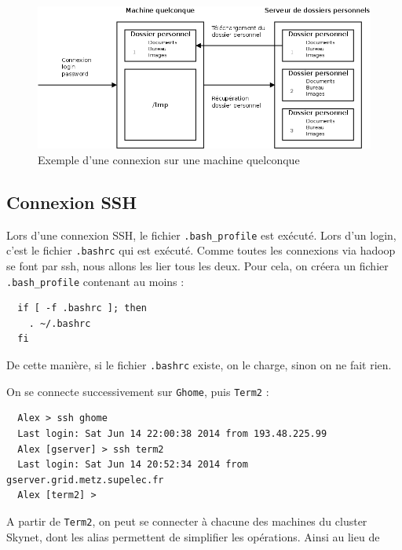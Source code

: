 \begin{figure}[h!]
  \centering
  \includegraphics[width=16cm]{images/connexion_supelec.png}
  \caption{Exemple d'une connexion sur une machine quelconque}
  \label{fig:connexion_supelec}
\end{figure}

\subsection{Connexion SSH}
\label{sec:connexion-ssh}

\par Lors d'une connexion SSH, le fichier \texttt{.bash\_profile} est exécuté. Lors d'un login, c'est le fichier \texttt{.bashrc} qui est exécuté. Comme toutes les connexions via hadoop se font par ssh, nous allons les lier tous les deux. Pour cela, on créera un fichier \texttt{.bash\_profile} contenant au moins :

\begin{verbatim}
  if [ -f .bashrc ]; then
    . ~/.bashrc
  fi
\end{verbatim}

\par De cette manière, si le fichier \texttt{.bashrc} existe, on le charge, sinon on ne fait rien.
\par On se connecte successivement sur \texttt{Ghome}, puis \texttt{Term2} :
\begin{verbatim}
  Alex > ssh ghome
  Last login: Sat Jun 14 22:00:38 2014 from 193.48.225.99
  Alex [gserver] > ssh term2
  Last login: Sat Jun 14 20:52:34 2014 from gserver.grid.metz.supelec.fr
  Alex [term2] > 
\end{verbatim}

\par A partir de \texttt{Term2}, on peut se connecter à chacune des machines du cluster Skynet, dont les alias permettent de simplifier les opérations. Ainsi au lieu de 

